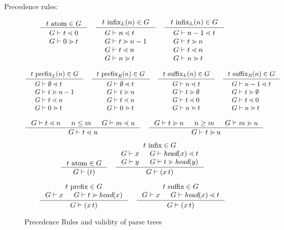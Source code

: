 \documentclass{article}
\begin{document}
Precedence rules:

\begin{figure}
  \[
  \inference{\hasfix{t}{\atom}{G}}{\twolines{\sld{G}{t}{0}}{\sgd{G}{0}{t}}}
  \quad
  \inference{\hasfix{t}{\infix{L}{n}}{G}}{\fourlines
    {\sld{G}{n}{t}}
    {\sgd{G}{t}{n-1}}
    {\sld{G}{t}{n}}
    {\sgd{G}{n}{t}}}
  \quad
  \inference{\hasfix{t}{\infix{L}{n}}{G}}{\fourlines
    {\sld{G}{n-1}{t}}
    {\sgd{G}{t}{n}}
    {\sld{G}{t}{n}}
    {\sgd{G}{n}{t}}}
  \]
  
  \[
  \inference{\hasfix{t}{\prefix{L}{n}}{G}}{\fourlines
    {\sld{G}{\emptyset}{t}}
    {\sgd{G}{t}{n-1}}
    {\sld{G}{t}{n}}
    {\sgd{G}{0}{t}}}
  \quad
  \inference{\hasfix{t}{\prefix{R}{n}}{G}}{\fourlines
    {\sld{G}{\emptyset}{t}}
    {\sgd{G}{t}{n}}
    {\sld{G}{t}{n}}
    {\sgd{G}{0}{t}}}
  \quad
  \inference{\hasfix{t}{\suffix{L}{n}}{G}}{\fourlines
    {\sld{G}{n}{t}}
    {\sgd{G}{t}{\emptyset}}
    {\sld{G}{t}{0}}
    {\sgd{G}{n}{t}}}
  \quad
  \inference{\hasfix{t}{\suffix{R}{n}}{G}}{\fourlines
    {\sld{G}{n-1}{t}}
    {\sgd{G}{t}{\emptyset}}
    {\sld{G}{t}{0}}
    {\sgd{G}{n}{t}}}
  \]
  
  \[
  \inference{\sld{G}{t}{n} & n \leq m & \sld{G}{m}{u}}{\sld{G}{t}{u}}
  \quad
  \inference{\sgd{G}{t}{n} & n \geq m & \sgd{G}{m}{u}}{\sgd{G}{t}{u}}
  \]
  
  \[
  \inference{\hasfix{t}{\atom}{G}}{\stree{G}{(t)}}
  \quad
  \inference
    {\hasfix{t}{\infix{}{}}{G} \\ \stree{G}{x} & \sld{G}{\head{x}}{t}
     \\ \stree{G}{y} & \sgd{G}{t}{\head{y}}}
    {\stree{G}{(x\,t)}}
  \]
  
  \[
  \inference
    {\hasfix{t}{\prefix{}{}}{G} \\ \stree{G}{x} & \sgd{G}{t}{\head{x}}}
    {\stree{G}{(x\,t)}}
  \quad
  \inference
    {\hasfix{t}{\suffix{}{}}{G} \\ \stree{G}{x} & \sld{G}{\head{x}}{t}}
    {\stree{G}{(x\,t)}}
  \]

\caption{Precedence Rules and validity of parse trees}
\end{figure}
\end{document}
